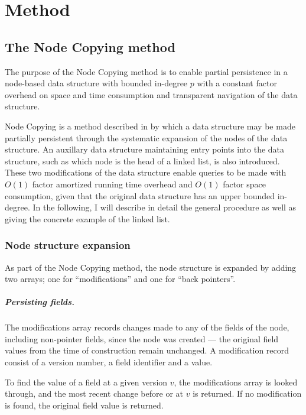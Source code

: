 \chapter{Method}

\section{The Node Copying method}
The purpose of the Node Copying method is to enable partial persistence in a
node-based data structure with bounded in-degree $p$ with a constant factor
overhead on space and time consumption and transparent navigation of the data
structure.

Node Copying is a method described in \cite{Driscoll198986} by which a data
structure may be made partially persistent through the systematic expansion of
the nodes of the data structure. An auxillary data structure maintaining entry
points into the data structure, such as which node is the head of a linked list,
is also introduced. These two modifications of the data structure enable queries
to be made with $O(1)$ factor amortized running time overhead and $O(1)$ factor
space consumption, given that the original data structure has an upper bounded
in-degree. In the following, I will describe in detail the general procedure as
well as giving the concrete example of the linked list.

\subsection{Node structure expansion}
As part of the Node Copying method, the node structure is expanded by adding two
arrays; one for ``modifications'' and one for ``back pointers''.

\paragraph{Persisting fields.}

The modifications array records changes made to any of the fields of the
node, including non-pointer fields, since the node was created --- the original
field values from the time of construction remain unchanged. A modification
record consist of a version number, a field identifier and a value.

To find the value of a field at a given version $v$, the modifications array is
looked through, and the most recent change before or at $v$ is returned. If no
modification is found, the original field value is returned.

